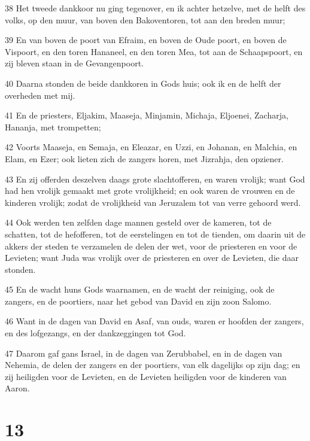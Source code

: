 \par 38 Het tweede dankkoor nu ging tegenover, en ik achter hetzelve, met de helft des volks, op den muur, van boven den Bakoventoren, tot aan den breden muur;
\par 39 En van boven de poort van Efraim, en boven de Oude poort, en boven de Vispoort, en den toren Hananeel, en den toren Mea, tot aan de Schaapspoort, en zij bleven staan in de Gevangenpoort.
\par 40 Daarna stonden de beide dankkoren in Gods huis; ook ik en de helft der overheden met mij.
\par 41 En de priesters, Eljakim, Maaseja, Minjamin, Michaja, Eljoenei, Zacharja, Hananja, met trompetten;
\par 42 Voorts Maaseja, en Semaja, en Eleazar, en Uzzi, en Johanan, en Malchia, en Elam, en Ezer; ook lieten zich de zangers horen, met Jizrahja, den opziener.
\par 43 En zij offerden deszelven daags grote slachtofferen, en waren vrolijk; want God had hen vrolijk gemaakt met grote vrolijkheid; en ook waren de vrouwen en de kinderen vrolijk; zodat de vrolijkheid van Jeruzalem tot van verre gehoord werd.
\par 44 Ook werden ten zelfden dage mannen gesteld over de kameren, tot de schatten, tot de hefofferen, tot de eerstelingen en tot de tienden, om daarin uit de akkers der steden te verzamelen de delen der wet, voor de priesteren en voor de Levieten; want Juda was vrolijk over de priesteren en over de Levieten, die daar stonden.
\par 45 En de wacht huns Gods waarnamen, en de wacht der reiniging, ook de zangers, en de poortiers, naar het gebod van David en zijn zoon Salomo.
\par 46 Want in de dagen van David en Asaf, van ouds, waren er hoofden der zangers, en des lofgezangs, en der dankzeggingen tot God.
\par 47 Daarom gaf gans Israel, in de dagen van Zerubbabel, en in de dagen van Nehemia, de delen der zangers en der poortiers, van elk dagelijks op zijn dag; en zij heiligden voor de Levieten, en de Levieten heiligden voor de kinderen van Aaron.

\chapter{13}

